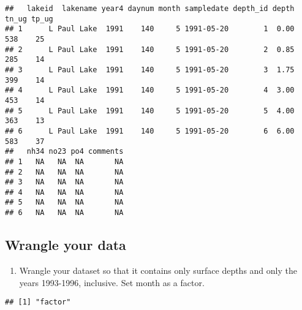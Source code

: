 \documentclass[]{article}
\newenvironment{Shaded}{\begin{snugshade}}{\end{snugshade}}
\newcommand{\DecValTok}[1]{\textcolor[rgb]{0.00,0.00,0.81}{#1}}
\newcommand{\KeywordTok}[1]{\textcolor[rgb]{0.13,0.29,0.53}{\textbf{#1}}}
\newcommand{\NormalTok}[1]{#1}
\newcommand{\OperatorTok}[1]{\textcolor[rgb]{0.81,0.36,0.00}{\textbf{#1}}}
\newcommand{\StringTok}[1]{\textcolor[rgb]{0.31,0.60,0.02}{#1}}
\providecommand{\tightlist}{%
  \setlength{\itemsep}{0pt}\setlength{\parskip}{0pt}}
\begin{document}
\begin{verbatim}
##   lakeid  lakename year4 daynum month sampledate depth_id depth tn_ug tp_ug
## 1      L Paul Lake  1991    140     5 1991-05-20        1  0.00   538    25
## 2      L Paul Lake  1991    140     5 1991-05-20        2  0.85   285    14
## 3      L Paul Lake  1991    140     5 1991-05-20        3  1.75   399    14
## 4      L Paul Lake  1991    140     5 1991-05-20        4  3.00   453    14
## 5      L Paul Lake  1991    140     5 1991-05-20        5  4.00   363    13
## 6      L Paul Lake  1991    140     5 1991-05-20        6  6.00   583    37
##   nh34 no23 po4 comments
## 1   NA   NA  NA       NA
## 2   NA   NA  NA       NA
## 3   NA   NA  NA       NA
## 4   NA   NA  NA       NA
## 5   NA   NA  NA       NA
## 6   NA   NA  NA       NA
\end{verbatim}

\hypertarget{wrangle-your-data}{%
\subsection{Wrangle your data}\label{wrangle-your-data}}

\begin{enumerate}
\def\labelenumi{\arabic{enumi}.}
\setcounter{enumi}{2}
\tightlist
\item
  Wrangle your dataset so that it contains only surface depths and only
  the years 1993-1996, inclusive. Set month as a factor.
\end{enumerate}

\begin{Shaded}
\end{Shaded}

\begin{verbatim}
## [1] "factor"
\end{verbatim}
\end{document}
